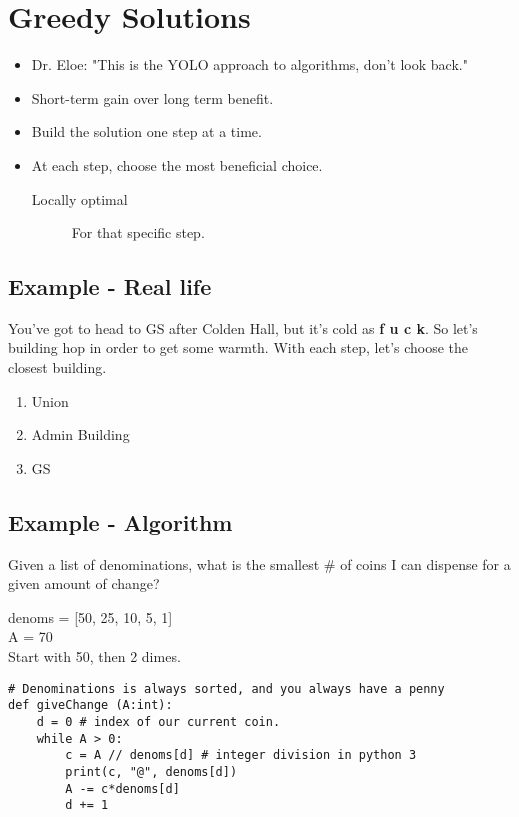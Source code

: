 \documentclass[11pt]{article}
\begin{document}
\section{Greedy Solutions}
\label{sec:org3bcfd4c}
\begin{itemize}
\item Dr. Eloe: "This is the YOLO approach to algorithms, don't look back."
\item Short-term gain over long term benefit.
\item Build the solution one step at a time.
\item At each step, choose the most beneficial choice.
\begin{description}
\item[{Locally optimal}] For that specific step.
\end{description}
\end{itemize}
\subsection{Example - Real life}
\label{sec:orge8e3b80}
You've got to head to GS after Colden Hall, but it's cold as \textbf{f u c k}. So let's building hop in order to get some warmth. With each step, let's choose the closest building.
\begin{enumerate}
\item Union
\item Admin Building
\item GS
\end{enumerate}
\subsection{Example - Algorithm}
\label{sec:orgc5e66f7}
\begin{description}
\item[{Coin changing}] Given a list of denominations, what is the smallest \# of coins I can dispense for a given amount of change?
\item denoms = [50, 25, 10, 5, 1] \\
A = 70 \\
Start with 50, then 2 dimes.
\end{description}

\begin{verbatim}
# Denominations is always sorted, and you always have a penny
def giveChange (A:int):
    d = 0 # index of our current coin.
    while A > 0:
        c = A // denoms[d] # integer division in python 3
        print(c, "@", denoms[d])
        A -= c*denoms[d]
        d += 1
\end{verbatim}
\end{document}
